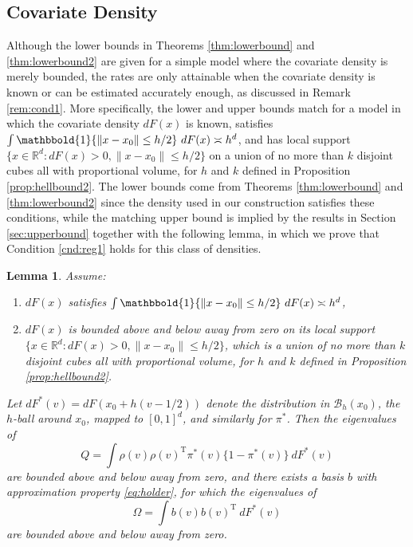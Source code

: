 \documentclass[11pt,twoside]{article}
\def\T{{ \mathrm{\scriptscriptstyle T} }}
\newcommand{\R}{\mathbb{R}}
\newcommand{\Holder}{\text{H\"{o}lder}}
\newcommand{\one}{\mathbbold{1}}
\newtheorem{applemma}{Lemma}
\theoremstyle{definition}
\theoremstyle{remark}
\begin{document}
\bigskip

\subsection{Covariate Density}
\label{sec:appcovdensity}
 
Although the lower bounds in Theorems \ref{thm:lowerbound} and \ref{thm:lowerbound2} are given for a simple model where the covariate density is merely bounded, the rates are only attainable when the covariate density is known or can be estimated accurately enough, as discussed in Remark \ref{rem:cond1}. More specifically, the lower and upper bounds match for a model in which 
the covariate density 
$dF(x)$ is known, satisfies $\int \one\{ \|x-x_0 \| \leq h/2 \} \ dF(x) \asymp h^d$, and has local support $\{x \in \R^d: dF(x)>0, \|x-x_0\| \leq h/2  \}$ on a union of no more than $k$ disjoint cubes all with proportional volume, for $h$ and $k$ defined in Proposition \ref{prop:hellbound2}. The lower bounds come from Theorems \ref{thm:lowerbound} and \ref{thm:lowerbound2} since the density used in our construction satisfies these conditions, while the matching upper bound is implied by the results in Section \ref{sec:upperbound} together with the following lemma, in which we prove that Condition \ref{cnd:reg1} holds for this class of densities. \\

\begin{applemma} \label{lem:covdensity}
Assume:
\begin{enumerate}
\item $dF(x)$ satisfies $\int \one\{ \|x-x_0 \| \leq h/2 \} \ dF(x) \asymp h^d$, 
\item $dF(x)$ is bounded above and below away from zero on its local support $\{x \in \R^d: dF(x)>0, \|x-x_0\| \leq h/2  \}$, which is a union of no more than $k$ disjoint cubes all with proportional volume, for $h$ and $k$ defined in Proposition \ref{prop:hellbound2}.
\end{enumerate}
Let $dF^*(v)=dF(x_0 + h(v-1/2))$ denote the distribution in  $\mathcal{B}_h(x_0)$, the $h$-ball around $x_0$,  mapped to $[0,1]^d$, and similarly for $\pi^*$.  Then the eigenvalues of 
$$  Q %
= \int  \rho(v)  \rho(v)^\T  \pi^*(v) \{ 1-\pi^*(v)\}\ dF^*(v) $$
are bounded above and below away from zero, and  there exists a basis $b$ with \Holder{} approximation property \eqref{eq:holder}, 
 for which the eigenvalues of
$$ \Omega = \int b(v) b(v)^\T \ dF^*(v) $$
are bounded above and below away from zero. 
\end{applemma}
\end{document}
